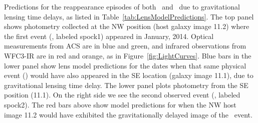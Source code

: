 \label{fig:SpockDelayPredictions}
Predictions for the reappearance episodes of both \spockone\
and \spocktwo\, due to gravitational lensing time delays, as listed in
Table~\ref{tab:LensModelPredictions}.  The top panel shows photometry
collected at the NW position (host galaxy image 11.2) where the first
event (\spockone, labeled spock1) appeared in January, 2014.  Optical
measurements from ACS are in blue and green, and infrared observations
from WFC3-IR are in red and orange, as in
Figure~\ref{fig:LightCurves}.  Blue bars in the lower panel show lens
model predictions for the dates when that same physical event
(\spockone) would have also appeared in the SE location (galaxy image
11.1), due to gravitational lensing time delay.  The lower panel plots
photometry from the SE position (11.1). On the right side we see the
second observed event (\spocktwo, labeled spock2).  The red bars above
show model predictions for when the NW host image 11.2 would have
exhibited the gravitationally delayed image of the \spocktwo\ event.
  
  
